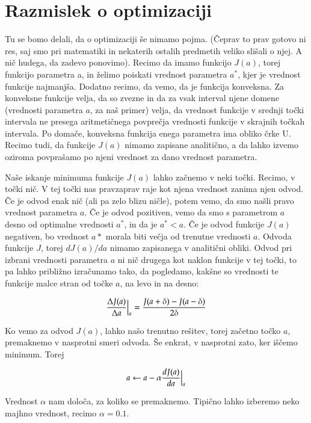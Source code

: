 \section{Razmislek o optimizaciji}

Tu se bomo delali, da o optimizaciji še nimamo pojma. (Čeprav to prav
gotovo ni res, saj smo pri matematiki in nekaterih ostalih predmetih
veliko slišali o njej. A nič hudega, da zadevo ponovimo). Recimo da
imamo funkcijo $J(a)$, torej funkcijo parametra a, in želimo poiskati
vrednost parametra $a^*$, kjer je vrednost funkcije najmanjša. Dodatno
recimo, da vemo, da je funkcija konveksna. Za konveksne funkcije
velja, da so zvezne in da za vsak interval njene domene (vrednosti
parametra $a$, za naš primer) velja, da vrednost funkcije v srednji
točki intervala ne presega aritmetičnega povprečja vrednosti funkcije
v skrajnih točkah intervala. Po domače, konveksna funkcija enega
parametra ima obliko črke U. Recimo tudi, da funkcije $J(a)$ nimamo
zapisane analitično, a da lahko izvemo oziroma povprašamo po njeni
vrednost za dano vrednost parametra.

Naše iskanje minimuma funkcije $J(a)$ lahko začnemo v neki
točki. Recimo, v točki nič. V tej točki nas pravzaprav raje kot njena
vrednost zanima njen odvod. Če je odvod enak nič (ali pa zelo blizu
ničle), potem vemo, da smo našli pravo vrednost parametra $a$. Če je
odvod pozitiven, vemo da smo s parametrom $a$ desno od optimalne
vrednosti $a^*$, in da je $a^*<a$. Če je odvod funkcije $J(a)$
negativen, bo vrednost $a*$ morala biti večja od trenutne vrednosti
$a$. Odvoda funkcije $J$, torej $dJ(a)/da$ nimamo zapisanega v
analitični obliki. Odvod pri izbrani vrednosti parametra $a$ ni nič
drugega kot naklon funkcije v tej točki, to pa lahko približno
izračunamo tako, da pogledamo, kakšne so vrednosti te funkcije malce
stran od točke $a$, na levo in na desno:

\begin{equation}
  {\Delta J(a)\over \Delta a}\Bigr|_{a} = {J(a+\delta) - J(a-\delta) \over
    2\delta}
\end{equation}

Ko vemo za odvod $J(a)$, lahko našo trenutno rešitev, torej začetno
točko $a$, premaknemo v nasprotni smeri odvoda. Še enkrat, v nasprotni
zato, ker iščemo minimum. Torej

\begin{equation}
  a \leftarrow a - \alpha {dJ(a)\over da}\Bigr|_{a}
\end{equation}

Vrednost $\alpha$ nam določa, za koliko se premaknemo. Tipično lahko
izberemo neko majhno vrednost, recimo $\alpha=0.1$.

